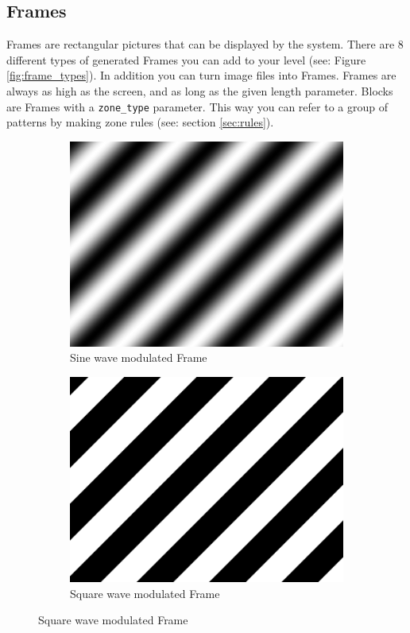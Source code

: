 \documentclass[11pt,a4paper]{article}
\begin{document}
\subsection{Frames}
Frames are rectangular pictures that can be displayed by the system. There are 8 different types of generated Frames you can add to your level (see: Figure \ref{fig:frame_types}). In addition you can turn image files into Frames. Frames are always as high as the screen, and as long as the given length parameter. Blocks are Frames with a \texttt{zone\_type} parameter. This way you can refer to a group of patterns by making zone rules (see: section \ref{sec:rules}).

\begin{figure}
\centering
	\begin{subfigure}[t]{0.35\textwidth}
	\includegraphics[width=1\textwidth]{sine.png}
	\caption{Sine wave modulated Frame}
	\label{fig:sine_frame}
	\end{subfigure}
	\hspace{1em}
	\begin{subfigure}[t]{0.35\textwidth}
	\includegraphics[width=1\textwidth]{square.png}
	\caption{Square wave modulated Frame}
	\label{fig:square_frame}
	\end{subfigure}


\end{figure}
\end{document}

